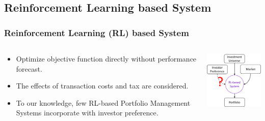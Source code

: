 \subsection{Reinforcement Learning based System}
\begin{frame}
\frametitle{Reinforcement Learning (RL) based System}
\begin{columns}
\begin{column}{0.55\textwidth}
\begin{itemize}
\item
Optimize objective function directly without performance forecast.
\item
The effects of transaction costs and tax are considered.
\item
\alert
{To our knowledge, few RL-based Portfolio Management Systems incorporate with investor preference.}
\end{itemize}
\end{column}
\begin{column}{0.45\textwidth}
\begin{center}
\includegraphics[width=4.8cm]{images/rl.png}
\end{center}
\end{column}
\end{columns}
\end{frame}






